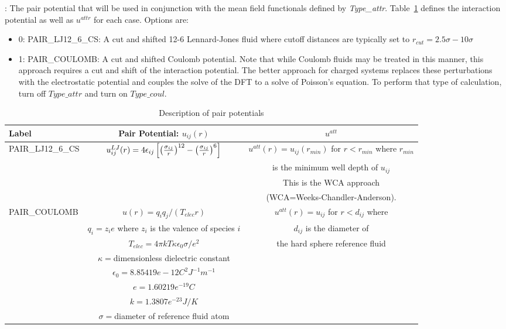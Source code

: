 \documentclass[10pt,onecolumn]{article}
\begin{document}
\noindent\dotfill

\vspace{0.1in}
:  The pair potential that will be used in conjunction with the
mean field functionals defined by {\it Type\_attr}.  Table~\ref{tab:pairpot} defines the interaction
potential as well as $u^{attr}$ for each case.  Options are:
\begin{itemize}
\item{0: PAIR\_LJ12\_6\_CS: A cut and shifted 12-6 Lennard-Jones fluid where
cutoff distances are typically set to $r_{cut}=2.5\sigma-10\sigma$}
\item{1: PAIR\_COULOMB: A cut and shifted Coulomb potential. Note that while Coulomb fluids may be treated in this manner, this approach requires a cut and shift of the interaction potential.  The better approach for charged systems replaces these perturbations with the electrostatic potential and couples the solve of the DFT to a solve of Poisson's equation.  To perform that type of calculation, turn off 
$Type\_attr$ and turn on $Type\_coul$.}
\end{itemize}
\begin{table}[h]
\center\begin{tabular}{|l|c|c|} \hline
Label & Pair Potential: $u_{ij}(r)$ & $u^{att}$ \\ \hline 
PAIR\_LJ12\_6\_CS &
$u_{ij}^{LJ}(r)=4\epsilon_{ij}\left[\left({\sigma_{ij}\over r}\right)^{12}-
        \left({\sigma_{ij}\over r}\right)^{6}\right]$ &
$u^{att}(r)=u_{ij}(r_{min})$ for $r<r_{min}$ where $r_{min}$ \\
& & is the minimum well depth of $u_{ij}$ \\
& & This is the WCA approach \\
 & &  (WCA=Weeks-Chandler-Anderson). \\
 \hline
 PAIR\_COULOMB & $u(r) = {q_i q_j}/({T_{elec} r})$ &
 $u^{att}(r)=u_{ij}$ for $r<d_{ij}$ where \\
 & $q_i=z_ie$ where $z_i$ is the valence of species $i$& $d_{ij}$ is the diameter of \\
 &$T_{elec}= 4\pi k T \kappa \epsilon_0 \sigma/e^2$& the hard sphere reference fluid  \\
& $\kappa=$dimensionless dielectric constant  & \\ 
 & $\epsilon_0=8.85419e-12 C^2 J^{-1} m^{-1}$  & \\ 
 &$e=1.60219e^{-19}C$  & \\ 
& $k=1.3807e^{-23} J/K$  & \\ 
& $\sigma=$diameter of reference fluid atom& \\ 
 \hline
 \end{tabular}
\caption{Description of pair potentials}
\label{tab:pairpot}
\end{table}
\end{document}
